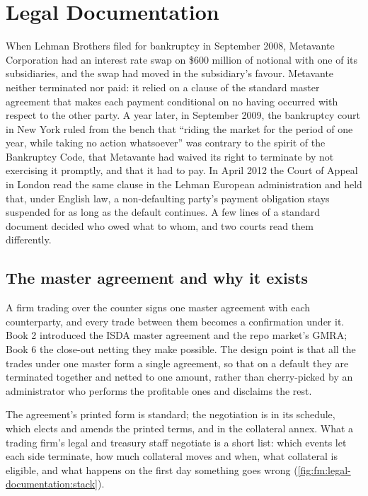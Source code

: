 \chapter{Legal Documentation}\label{ch:fm:legal-documentation}

When Lehman Brothers filed for bankruptcy in September 2008, Metavante Corporation had an interest rate swap on \$600 million of notional with
one of its subsidiaries, and the swap had moved in the subsidiary's favour. Metavante neither terminated nor paid: it relied on a clause of the
standard master agreement that makes each payment conditional on no  having occurred with respect to the other party. A year
later, in September 2009, the bankruptcy court in New York ruled from the bench that ``riding the market for the period of one year, while taking
no action whatsoever'' was contrary to the spirit of the Bankruptcy Code, that Metavante had waived its right to terminate by not exercising it
promptly, and that it had to pay. In April 2012 the Court of Appeal in London read the same clause in the Lehman European administration and held
that, under English law, a non-defaulting party's payment obligation stays suspended for as long as the default continues. A few lines of a
standard document decided who owed what to whom, and two courts read them differently.

\section{The master agreement and why it exists}

A firm trading over the counter signs one master agreement with each counterparty, and every trade between them becomes a confirmation under it.
Book 2 introduced the ISDA master agreement and the repo market's GMRA; Book 6 the close-out netting they make possible. The design point is that
all the trades under one master form a single agreement, so that on a default they are terminated together and netted to one amount, rather
than cherry-picked by an administrator who performs the profitable ones and disclaims the rest.

The agreement's printed form is standard; the negotiation is in its schedule, which elects and amends the printed terms, and in the collateral
annex. What a trading firm's legal and treasury staff negotiate is a short list: which events let each side terminate, how much collateral moves
and when, what collateral is eligible, and what happens on the first day something goes wrong (\cref{fig:fm:legal-documentation:stack}).

